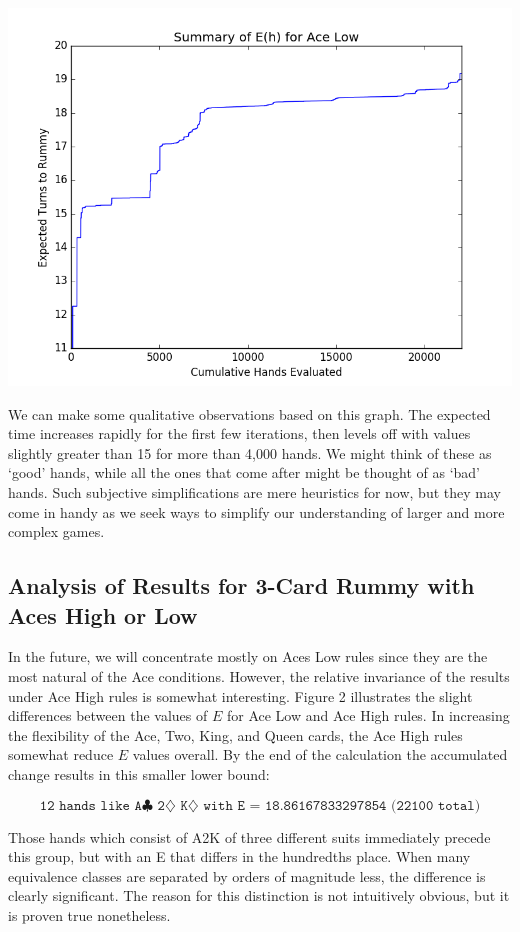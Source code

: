 \documentclass[paper=a4, fontsize=11pt,twoside]{report}   %
\begin{document}
\includegraphics[width=\textwidth]{fig1.png}

We can make some qualitative observations based on this graph. The expected time increases rapidly for the first few iterations, then levels off with values slightly greater than 15 for more than 4,000 hands. We might think of these as ‘good’ hands, while all the ones that come after might be thought of as ‘bad’ hands. Such subjective simplifications are mere heuristics for now, but they may come in handy as we seek ways to simplify our understanding of larger and more complex games. 

\subsection{Analysis of Results for 3-Card Rummy with Aces High or Low}

In the future, we will concentrate mostly on Aces Low rules since they are the most natural of the Ace conditions. However, the relative invariance of the results under Ace High rules is somewhat interesting. Figure 2 illustrates the slight differences between the values of $E$ for Ace Low and Ace High rules. In increasing the flexibility of the Ace, Two, King, and Queen cards, the Ace High rules somewhat reduce $E$ values overall. By the end of the calculation the accumulated change results in this smaller lower bound:

$$\texttt{12 hands like A$\clubsuit$ 2$\diamondsuit$ K$\diamondsuit$ with E = 18.86167833297854 (22100 total)}$$

Those hands which consist of A2K of three different suits immediately precede this group, but with an E that differs in the hundredths place. When many equivalence classes are separated by orders of magnitude less, the difference is clearly significant. The reason for this distinction is not intuitively obvious, but it is proven true nonetheless. 
\end{document}
